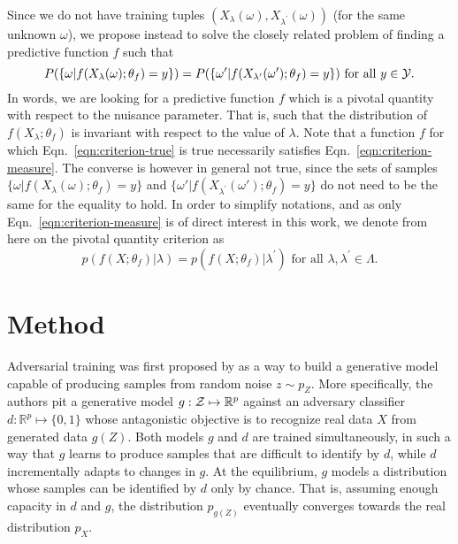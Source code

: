 \documentclass{article}
\theoremstyle{plain}
\begin{document}
Since we do not have training tuples $(X_{\lambda}(\omega),
X_{\lambda^\prime}(\omega))$ (for the same unknown $\omega$), we propose instead to
solve the closely related problem of finding a predictive function $f$ such that
\begin{equation}\label{eqn:criterion-measure}
    P(\{ \omega | f(X_{\lambda}(\omega) ; \theta_f) = y \} ) = P( \{ \omega' | f(X_{\lambda^\prime}(\omega') ; \theta_f) = y\}) \text{ for all $y \in {\cal Y}$}.
\end{equation}
In words, we are looking for a predictive function $f$ which is a pivotal
quantity \citep{degroot1986probability} with respect to the nuisance parameter.
That is, such that  the distribution of $f(X_\lambda; \theta_f)$ is invariant
with respect to the value of $\lambda$. Note that a function $f$ for which
Eqn.~\ref{eqn:criterion-true} is true necessarily satisfies
Eqn.~\ref{eqn:criterion-measure}. The converse is however in general not true, since the
sets of samples $\{ \omega | f(X_{\lambda}(\omega); \theta_f) = y \}$ and $\{
\omega' | f(X_{\lambda^\prime}(\omega'); \theta_f) = y \}$ do not need to be the same
for the equality to hold.
In order to simplify notations,
and as only Eqn.~\ref{eqn:criterion-measure} is
of direct interest in this work, we denote from here on
the pivotal quantity criterion as
\begin{equation}\label{eqn:criterion}
    p(f(X ; \theta_f) | \lambda ) = p(f(X ; \theta_f) | \lambda^\prime ) \text{ for all $\lambda,\lambda^\prime \in  \Lambda$.}
\end{equation}


\section{Method}
\label{sec:method}

Adversarial training was first proposed by \cite{goodfellow2014generative} as a
way to build a generative model capable of producing samples from random noise
$z \sim p_Z$. More specifically, the authors pit a generative model $g: {\cal Z}
\mapsto \mathbb{R}^p$ against an adversary classifier $d : \mathbb{R}^p \mapsto \{
0, 1\}$ whose antagonistic objective is to recognize real data $X$ from generated data $g(Z)$. Both
models $g$ and $d$ are trained simultaneously, in such a way that $g$ learns to
produce samples that are difficult to identify by $d$, while $d$ incrementally
adapts to changes in $g$. At the equilibrium, $g$ models a distribution whose
samples can be identified by $d$ only by chance. That is, assuming enough
capacity in $d$ and  $g$, the distribution $p_{g(Z)}$ eventually converges
towards the real distribution $p_X$.
\end{document}
